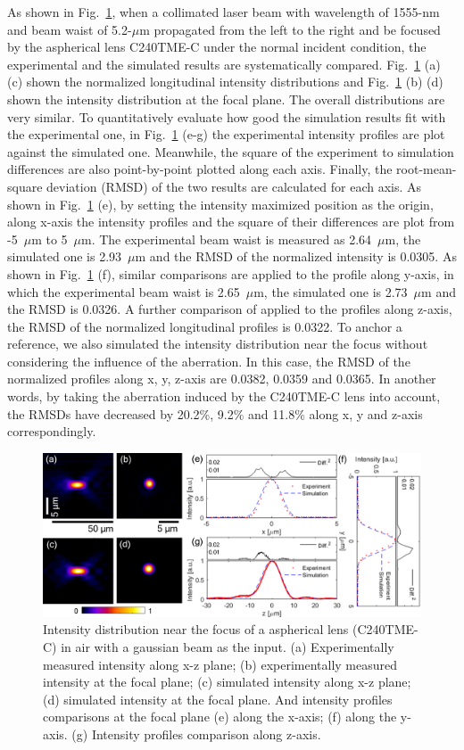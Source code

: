 \documentclass[9pt,twocolumn,twoside]{osajnl}
\begin{document}
As shown in Fig.~\ref{fig:3b}, when a collimated laser beam with wavelength of 1555-nm and beam waist of 5.2-$\mu$m propagated from the left to the right and be focused by the aspherical lens C240TME-C under the normal incident condition, the experimental and the simulated results are systematically compared. Fig.~\ref{fig:3b} (a) (c) shown the normalized longitudinal intensity distributions and Fig.~\ref{fig:3b} (b) (d) shown the intensity distribution at the focal plane. The overall distributions are very similar. To quantitatively evaluate how good the simulation results fit with the experimental one, in Fig.~\ref{fig:3b} (e-g) the experimental intensity profiles are plot against the simulated one. Meanwhile, the square of the experiment to simulation differences are also point-by-point plotted along each axis. Finally, the root-mean-square deviation (RMSD) of the two results are calculated for each axis. As shown in Fig.~\ref{fig:3b} (e), by setting the intensity maximized position as the origin, along x-axis the intensity profiles and the square of their differences are plot from  -5~$\mu$m to 5~$\mu$m. The experimental beam waist is measured as 2.64~$\mu$m, the simulated one is 2.93~$\mu$m and the RMSD of the normalized intensity is 0.0305. As shown in Fig.~\ref{fig:3b} (f), similar comparisons are applied to the profile along y-axis, in which the experimental beam waist is 2.65~$\mu$m, the simulated one is 2.73~$\mu$m and the RMSD is 0.0326. A further comparison of applied to the profiles along z-axis, the RMSD of the normalized longitudinal profiles is 0.0322. To anchor a reference, we also simulated the intensity distribution near the focus without considering the influence of the aberration. In this case, the RMSD of the normalized profiles along x, y, z-axis are 0.0382, 0.0359 and 0.0365. In another words, by taking the aberration induced by the C240TME-C lens into account, the RMSDs have decreased by 20.2\%, 9.2\% and 11.8\% along x, y and z-axis correspondingly.

\begin{figure}
	\centering
	\includegraphics[width=\linewidth]{../AppOptics/figures/C240TME-C.pdf}
	\caption{Intensity distribution near the focus of a aspherical lens (C240TME-C) in air with a gaussian beam as the input. (a) Experimentally measured intensity along x-z plane; (b) experimentally measured intensity at the focal plane; (c) simulated intensity along x-z plane; (d) simulated intensity at the focal plane. And intensity profiles comparisons at the focal plane (e) along the x-axis; (f) along the y-axis. (g) Intensity profiles comparison along z-axis.}\label{fig:3b}
\end{figure}
\end{document}
